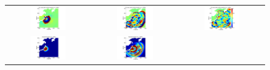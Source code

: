 \begin{figure}[ht]
        \begin{tabular}{ccc}
\hspace*{-55pt}
\includegraphics[width=0.45\textwidth]{./figures/mean2d1.pdf} &
\hspace*{-45pt}
\includegraphics[width=0.45\textwidth]{./figures/mean2d3.pdf} &
\hspace*{-45pt}
\includegraphics[width=0.45\textwidth]{./figures/mean2d4.pdf} \\
\hspace*{-55pt}
\includegraphics[width=0.45\textwidth]{./figures/sigma2d1.pdf} &
\hspace*{-45pt}
\includegraphics[width=0.45\textwidth]{./figures/sigma2d3.pdf} &

\end{tabular}
\end{figure}
